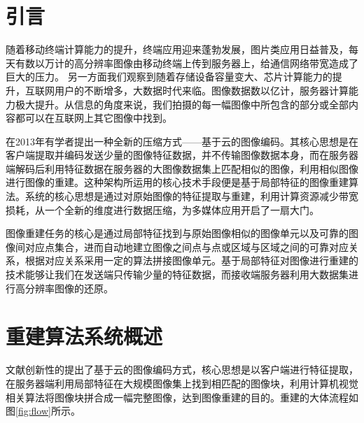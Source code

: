 \documentclass[UTF8]{csoarticle}
\begin{document}

\maketitle



\section{引言}

随着移动终端计算能力的提升，终端应用迎来蓬勃发展，图片类应用日益普及，每天有数以万计的高分辨率图像由移动终端上传到服务器上，给通信网络带宽造成了巨大的压力。
另一方面我们观察到随着存储设备容量变大、芯片计算能力的提升，互联网用户的不断增多，大数据时代来临。图像数据数以亿计，服务器计算能力极大提升。从信息的角度来说，我们拍摄的每一幅图像中所包含的部分或全部内容都可以在互联网上其它图像中找到。

在2013年有学者提出一种全新的压缩方式——基于云的图像编码。其核心思想是在客户端提取并编码发送少量的图像特征数据，并不传输图像数据本身，而在服务器端解码后利用特征数据在服务器的大图像数据集上匹配相似的图像，利用相似图像进行图像的重建。这种架构所运用的核心技术手段便是基于局部特征的图像重建算法。系统的核心思想是通过对原始图像的特征提取与重建，利用计算资源减少带宽损耗，从一个全新的维度进行数据压缩，为多媒体应用开启了一扇大门。

图像重建任务的核心是通过局部特征找到与原始图像相似的图像单元以及可靠的图像间对应点集合，进而自动地建立图像之间点与点或区域与区域之间的可靠对应关系，根据对应关系采用一定的算法拼接图像单元。基于局部特征对图像进行重建的技术能够让我们在发送端只传输少量的特征数据，而接收端服务器利用大数据集进行高分辨率图像的还原。



\section{重建算法系统概述}
文献\cite{Cloud}创新性的提出了基于云的图像编码方式，核心思想是以客户端进行特征提取，在服务器端利用局部特征在大规模图像集上找到相匹配的图像块，利用计算机视觉相关算法将图像块拼合成一幅完整图像，达到图像重建的目的。重建的大体流程如图\ref{fig:flow}所示。
\end{document}
